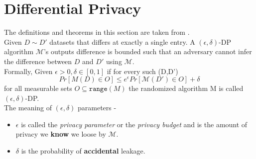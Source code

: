 \section{Differential Privacy}
The definitions and theorems in this section are taken from \cite{Dwork2014ThePrivacy}. \\
Given $D \sim D'$ datasets that differs at exactly a single entry. A $(\epsilon,\delta)$-DP algorithm $\mathcal{M}$'s outputs difference is bounded such that an adversary cannot infer the difference between $D$ and $D'$ using  $\mathcal{M}$. \\
Formally, Given $\epsilon>0, \delta \in [0,1]$ if for every such (D,D')  
$$  Pr[M(D) \in O] \leq e^{\epsilon}Pr[\mathcal{M}(D') \in O]+ \delta$$ for all measurable sets $O \subseteq \texttt{range}(M)$ the randomized algorithm M is called $(\epsilon,\delta)$-DP. \\

The meaning of $(\epsilon, \delta)$ parameters - \\
\begin{itemize}
    \item $\epsilon$ is called the \textit{privacy parameter} or the \textit{privacy budget} and is the amount of privacy we \textbf{know} we loose by $\mathcal{M}$. 
    \item $\delta$ is the probability of \textbf{accidental} leakage.
\end{itemize}


